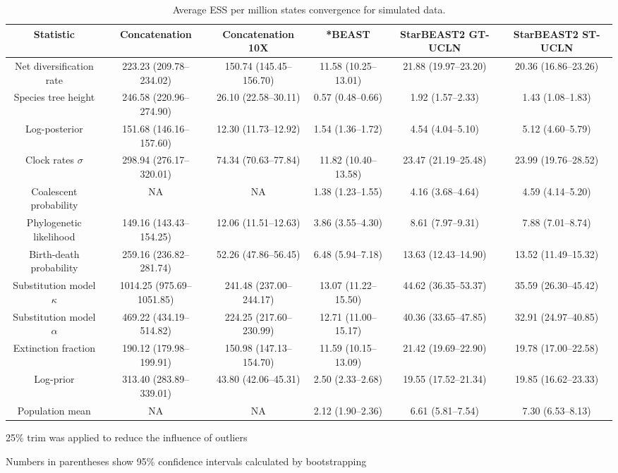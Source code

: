 \documentclass[12pt]{article}
\begin{document}
\begin{landscape}
\clearpage

\begin{table}[htb!]
\centering
\caption{Average ESS per million states convergence for simulated data.}
\label{tab:simulatedPerMstates}
\begin{threeparttable}
\begin{adjustbox}{center}
\renewcommand{\arraystretch}{1.2}
\footnotesize
\begin{tabular}{|c|c|c|c|c|c|}
\multicolumn{1}{c}{Statistic} & \multicolumn{1}{c}{Concatenation} & \multicolumn{1}{c}{Concatenation 10X} & \multicolumn{1}{c}{*BEAST} & \multicolumn{1}{c}{StarBEAST2 GT-UCLN} & \multicolumn{1}{c}{StarBEAST2 ST-UCLN}\tabularnewline
\hline
Net diversification rate & 223.23 (209.78--234.02) & 150.74 (145.45--156.70) & 11.58 (10.25--13.01) & 21.88 (19.97--23.20) & 20.36 (16.86--23.26)\tabularnewline
\hline
Species tree height & 246.58 (220.96--274.90) & 26.10 (22.58--30.11) & 0.57 (0.48--0.66) & 1.92 (1.57--2.33) & 1.43 (1.08--1.83)\tabularnewline
\hline
Log-posterior & 151.68 (146.16--157.60) & 12.30 (11.73--12.92) & 1.54 (1.36--1.72) & 4.54 (4.04--5.10) & 5.12 (4.60--5.79)\tabularnewline
\hline
Clock rates $\sigma$ & 298.94 (276.17--320.01) & 74.34 (70.63--77.84) & 11.82 (10.40--13.58) & 23.47 (21.19--25.48) & 23.99 (19.76--28.52)\tabularnewline
\hline
Coalescent probability & NA & NA & 1.38 (1.23--1.55) & 4.16 (3.68--4.64) & 4.59 (4.14--5.20)\tabularnewline
\hline
Phylogenetic likelihood & 149.16 (143.43--154.25) & 12.06 (11.51--12.63) & 3.86 (3.55--4.30) & 8.61 (7.97--9.31) & 7.88 (7.01--8.74)\tabularnewline
\hline
Birth-death probability & 259.16 (236.82--281.74) & 52.26 (47.86--56.45) & 6.48 (5.94--7.18) & 13.63 (12.43--14.90) & 13.52 (11.49--15.32)\tabularnewline
\hline
Substitution model $\kappa$ & 1014.25 (975.69--1051.85) & 241.48 (237.00--244.17) & 13.07 (11.22--15.50) & 44.62 (36.35--53.37) & 35.59 (26.30--45.42)\tabularnewline
\hline
Substitution model $\alpha$ & 469.22 (434.19--514.82) & 224.25 (217.60--230.99) & 12.71 (11.00--15.17) & 40.36 (33.65--47.85) & 32.91 (24.97--40.85)\tabularnewline
\hline
Extinction fraction & 190.12 (179.98--199.91) & 150.98 (147.13--154.70) & 11.59 (10.15--13.09) & 21.42 (19.69--22.90) & 19.78 (17.00--22.58)\tabularnewline
\hline
Log-prior & 313.40 (283.89--339.01) & 43.80 (42.06--45.31) & 2.50 (2.33--2.68) & 19.55 (17.52--21.34) & 19.85 (16.62--23.33)\tabularnewline
\hline
Population mean & NA & NA & 2.12 (1.90--2.36) & 6.61 (5.81--7.54) & 7.30 (6.53--8.13)\tabularnewline
\hline
\end{tabular}
\end{adjustbox}
\begin{tablenotes}
\footnotesize
\item 25\% trim was applied to reduce the influence of outliers
\item Numbers in parentheses show 95\% confidence intervals calculated by bootstrapping
\end{tablenotes}
\end{threeparttable}
\end{table}

\end{landscape}
\end{document}
